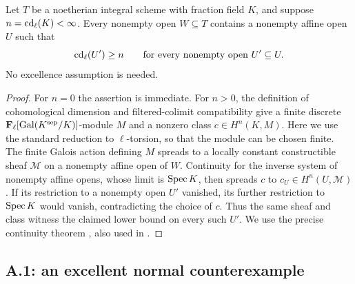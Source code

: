 \begin{proposition}
\label{A:spread}
Let $T$ be a noetherian integral scheme with fraction field $K$, and suppose $n=\operatorname{cd}_\ell(K)<\infty$. Every nonempty open $W\subseteq T$ contains a nonempty affine open $U$ such that
\[
\operatorname{cd}_\ell(U')\geq n
\qquad\text{for every nonempty open }U'\subseteq U.
\]
No excellence assumption is needed.
\end{proposition}
\begin{proof}
For $n=0$ the assertion is immediate. For $n>0$, the definition of cohomological dimension and filtered-colimit compatibility give a finite discrete $\mathbf F_\ell[\operatorname{Gal}(K^{\mathrm{sep}}/K)]$-module $M$ and a nonzero class $c\in H^n(K,M)$. Here we use the standard reduction to $\ell$-torsion, so that the module can be chosen finite. The finite Galois action defining $M$ spreads to a locally constant constructible sheaf $\mathcal M$ on a nonempty affine open of $W$. Continuity for the inverse system of nonempty affine opens, whose limit is $\operatorname{Spec} K$, then spreads $c$ to $c_U\in H^n(U,\mathcal M)$. If its restriction to a nonempty open $U'$ vanished, its further restriction to $\operatorname{Spec} K$ would vanish, contradicting the choice of $c$. Thus the same sheaf and class witness the claimed lower bound on every such $U'$. We use the precise continuity theorem \citet[Exposé VII, Théorème 5.7]{A_SGA4}, also used in \citet[Exposé XVIII$_A$, proof of Corollary 1.2]{A_ILO2014}.
\end{proof}

\subsection{A.1: an excellent normal counterexample}

